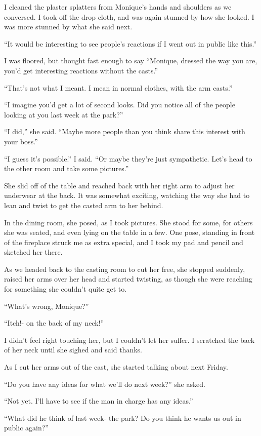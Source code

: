 I cleaned the plaster splatters from Monique's hands and shoulders as we conversed. I took
off the drop cloth, and was again stunned by how she looked. I was more stunned by what she said
next.

``It would be interesting to see people's reactions if I went out in public like this.''

I was floored, but thought fast enough to say ``Monique, dressed the way you are, you'd
get interesting reactions without the casts.''

``That's not what I meant. I mean in normal clothes, with the arm casts.''

``I imagine you'd get a lot of second looks. Did you notice all of the people looking at
you last week at the park?''

``I did,'' she said. ``Maybe more people than you think share this interest with your
boss.''

``I guess it's possible.'' I said. ``Or maybe they're just sympathetic. Let's head to the
other room and take some pictures.''

She slid off of the table and reached back with her right arm to adjust her underwear at
the back. It was somewhat exciting, watching the way she had to lean and twist to get the casted
arm to her behind.

In the dining room, she posed, as I took pictures. She stood for some, for others she was
seated, and even lying on the table in a few. One pose, standing in front of the fireplace
struck me as extra special, and I took my pad and pencil and sketched her there.

As we headed back to the casting room to cut her free, she stopped suddenly, raised her
arms over her head and started twisting, as though she were reaching for something she couldn't
quite get to.

``What's wrong, Monique?''

``Itch!- on the back of my neck!''

I didn't feel right touching her, but I couldn't let her suffer. I scratched the back of
her neck until she sighed and said thanks.

As I cut her arms out of the cast, she started talking about next Friday.

``Do you have any ideas for what we'll do next week?'' she asked.

``Not yet. I'll have to see if the man in charge has any ideas.''

``What did he think of last week- the park? Do you think he wants us out in public
again?''

